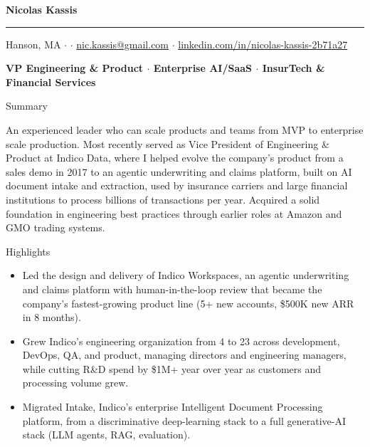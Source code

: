 \documentclass[10pt,oneside]{article}
\makeatletter
\newcommand{\name}{Nicolas Kassis}
\newcommand{\location}{Hanson, MA}
\newcommand{\email}{nic.kassis@gmail.com}
\newcommand{\linkedinurl}{linkedin.com/in/nicolas-kassis-2b71a27}
\providecommand*{\phone}{}
\newcommand{\phoneblock}{\ifx\phone\empty\else\phone{} \; $\cdot$ \; \fi}
\newcommand{\bigname}[1]{
  \begin{center}\fontfamily{phv}\selectfont\Huge\bfseries#1\end{center}
}
\newcommand{\headline}[1]{
  \begin{center}\fontfamily{phv}\selectfont\small\bfseries#1\end{center}
}
\newenvironment{ressection}[1]{
  \vspace{4pt}
  {\fontfamily{phv}\selectfont\Large#1}
  \begin{itemize}
    \vspace{3pt}
}{
  \end{itemize}
}
\newcommand{\ressubitem}[1]{
  \vspace{-1pt}
\item \begin{flushleft} #1 \end{flushleft}
}
\makeatother
\begin{document}
\bigname{\name}
\vspace{-8pt} \rule{\textwidth}{1pt}
\vspace{2pt}
\begin{center}
  {\small \location{} \; $\cdot$ \; \phoneblock\href{mailto:\email}{\email} \; $\cdot$ \; \href{https://\linkedinurl}{\linkedinurl}}
\end{center}
\headline{VP Engineering \& Product $\cdot$ Enterprise AI/SaaS $\cdot$ InsurTech \& Financial Services}
\vspace{6pt}

\vspace{4pt}
{\selectfont\Large Summary}
\vspace{3pt}

\begin{flushleft}
An experienced leader who can scale products and teams from MVP to enterprise scale production. Most recently served as Vice President of Engineering \& Product at Indico Data, where I helped evolve the company's product from a sales demo in 2017 to an agentic underwriting and claims platform, built on AI document intake and extraction, used by insurance carriers and large financial institutions to process billions of transactions per year. Acquired a solid foundation in engineering best practices through earlier roles at Amazon and GMO trading systems.
\end{flushleft}

\begin{ressection}{Highlights}
  \ressubitem{Led the design and delivery of Indico Workspaces, an agentic underwriting and claims platform with human-in-the-loop review that became the company's fastest-growing product line (5+ new accounts, \$500K new ARR in 8 months).}
  \ressubitem{Grew Indico's engineering organization from 4 to 23 across development, DevOps, QA, and product, managing directors and engineering managers, while cutting R\&D spend by \$1M+ year over year as customers and processing volume grew.}
  \ressubitem{Migrated Intake, Indico's enterprise Intelligent Document Processing platform, from a discriminative deep-learning stack to a full generative-AI stack (LLM agents, RAG, evaluation).}
\end{ressection}
\end{document}

